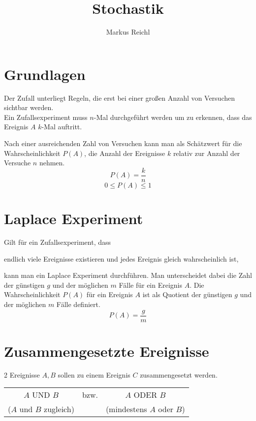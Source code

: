 \documentclass{school}
\title{Stochastik}
\author{Markus Reichl}
\begin{document}
\maketitle
\thispagestyle{fancy}	%

\tableofcontents

\newpage
\section{Grundlagen}
Der Zufall unterliegt Regeln, die erst bei einer großen Anzahl von Versuchen sichtbar werden.\\
Ein Zufallsexperiment muss $n$-Mal durchgeführt werden um zu erkennen, dass das Ereignis $A$ $k$-Mal auftritt.

Nach einer ausreichenden Zahl von Versuchen kann man als Schätzwert für die Wahrscheinlichkeit $P(A)$, die Anzahl der Ereignisse $k$ relativ zur Anzahl der Versuche $n$ nehmen.
$$P(A) = \frac{k}{n}$$
{\footnotesize $$0 \leqslant P(A) \leqslant 1$$}
\begin{vardefs}
\end{vardefs}

\section{Laplace Experiment}
Gilt für ein Zufallsexperiment, dass
\begin{outline}
\1 endlich viele Ereignisse existieren und
\1 jedes Ereignis gleich wahrscheinlich ist,
\end{outline}
kann man ein Laplace Experiment durchführen. Man unterscheidet dabei die Zahl der günstigen $g$ und der möglichen $m$ Fälle für ein Ereignis $A$. Die Wahrscheinlichkeit $P(A)$ für ein Ereignis $A$ ist als Quotient der günstigen $g$ und der möglichen $m$ Fälle definiert.
$$P(A) = \frac{g}{m}$$

\section{Zusammengesetzte Ereignisse}
2 Ereignisse $A, B$ sollen zu einem Ereignis $C$ zusammengesetzt werden.
\begin{center}
\begin{tabularx}{0.5\textwidth}{c c c}
	$A$ UND $B$ & bzw. & $A$ ODER $B$\\
	{\small ($A$ und $B$ zugleich)} & & {\small (mindestens $A$ oder $B$)}
\end{tabularx}
\end{center}
\end{document}
